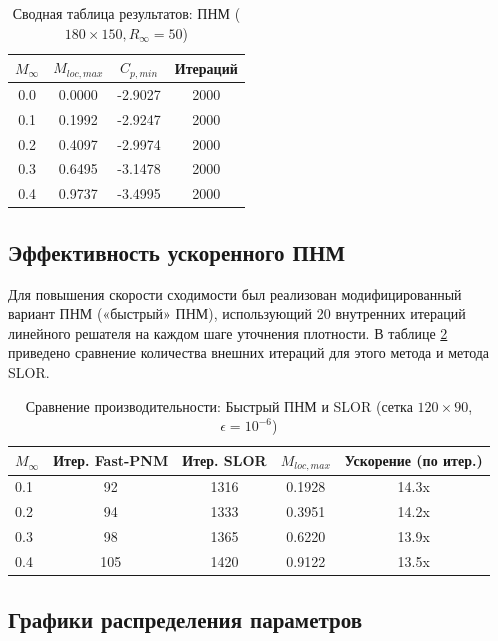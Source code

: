 \documentclass[a4paper,12pt]{article}
\begin{document}
	\begin{table}[H]
		\centering
		\caption{Сводная таблица результатов: ПНМ ($180 \times 150, R_\infty = 50$)}
		\label{tab:summary}
		\begin{tabular}{cccc}
			\toprule
			$M_\infty$ & $M_{loc, max}$ & $C_{p, min}$ & Итераций \\
			\midrule
			0.0 & 0.0000 & -2.9027 & 2000 \\
			0.1 & 0.1992 & -2.9247 & 2000 \\
			0.2 & 0.4097 & -2.9974 & 2000 \\
			0.3 & 0.6495 & -3.1478 & 2000 \\
			0.4 & 0.9737 & -3.4995 & 2000 \\
			\bottomrule
		\end{tabular}
	\end{table}

	\subsection{Эффективность ускоренного ПНМ}

	Для повышения скорости сходимости был реализован модифицированный вариант ПНМ («быстрый» ПНМ), использующий 20 внутренних итераций линейного решателя на каждом шаге уточнения плотности. В таблице \ref{tab:fast_comp} приведено сравнение количества внешних итераций для этого метода и метода SLOR.

	\begin{table}[H]
		\centering
		\caption{Сравнение производительности: Быстрый ПНМ и SLOR (сетка $120 \times 90$, $\epsilon=10^{-6}$)}
		\label{tab:fast_comp}
		\begin{tabular}{lcccc}
			\toprule
			$M_\infty$ & Итер. Fast-PNM & Итер. SLOR & $M_{loc, max}$ & Ускорение (по итер.) \\
			\midrule
			0.1 & 92 & 1316 & 0.1928 & 14.3x \\
			0.2 & 94 & 1333 & 0.3951 & 14.2x \\
			0.3 & 98 & 1365 & 0.6220 & 13.9x \\
			0.4 & 105 & 1420 & 0.9122 & 13.5x \\
			\bottomrule
		\end{tabular}
	\end{table}

	\subsection{Графики распределения параметров}
\end{document}
